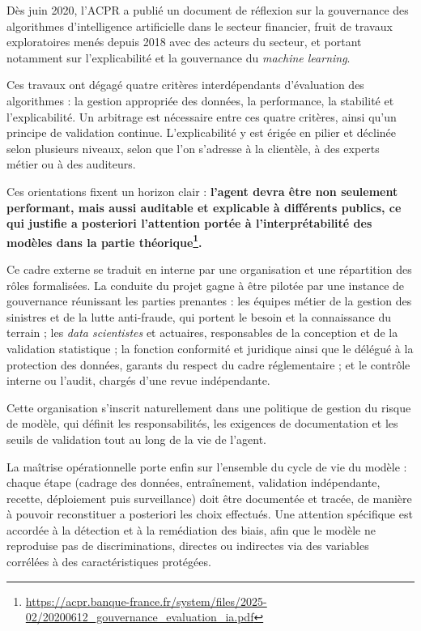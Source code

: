 Dès juin 2020, l'ACPR a publié un document de réflexion sur la gouvernance des algorithmes d'intelligence artificielle dans le secteur financier, fruit de travaux exploratoires menés depuis 2018 avec des acteurs du secteur, et portant notamment sur l'explicabilité et la gouvernance du \textit{machine learning}.

Ces travaux ont dégagé quatre critères interdépendants d'évaluation des algorithmes : la gestion appropriée des données, la performance, la stabilité et l'explicabilité. Un arbitrage est nécessaire entre ces quatre critères, ainsi qu'un principe de validation continue. L'explicabilité y est érigée en pilier et déclinée selon plusieurs niveaux, selon que l'on s'adresse à la clientèle, à des experts métier ou à des auditeurs.

Ces orientations fixent un horizon clair : \textbf{l'agent devra être non seulement performant, mais aussi auditable et explicable à différents publics, ce qui justifie a posteriori l'attention portée à l'interprétabilité des modèles dans la partie théorique\footnote{\url{https://acpr.banque-france.fr/system/files/2025-02/20200612_gouvernance_evaluation_ia.pdf}}.}

Ce cadre externe se traduit en interne par une organisation et une répartition des rôles formalisées. La conduite du projet gagne à être pilotée par une instance de gouvernance réunissant les parties prenantes : les équipes métier de la gestion des sinistres et de la lutte anti-fraude, qui portent le besoin et la connaissance du terrain ; les \textit{data scientistes} et actuaires, responsables de la conception et de la validation statistique ; la fonction conformité et juridique ainsi que le délégué à la protection des données, garants du respect du cadre réglementaire ; et le contrôle interne ou l'audit, chargés d'une revue indépendante.

Cette organisation s'inscrit naturellement dans une politique de gestion du risque de modèle, qui définit les responsabilités, les exigences de documentation et les seuils de validation tout au long de la vie de l'agent.

La maîtrise opérationnelle porte enfin sur l'ensemble du cycle de vie du modèle : chaque étape (cadrage des données, entraînement, validation indépendante, recette, déploiement puis surveillance) doit être documentée et tracée, de manière à pouvoir reconstituer a posteriori les choix effectués. Une attention spécifique est accordée à la détection et à la remédiation des biais, afin que le modèle ne reproduise pas de discriminations, directes ou indirectes via des variables corrélées à des caractéristiques protégées.

